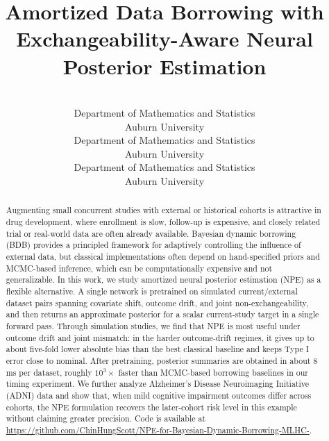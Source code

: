 \documentclass[pmlr]{jmlr}
\title{%
 Amortized Data Borrowing with Exchangeability-Aware Neural Posterior Estimation}
\author{%
  \Name{Chin-Hung Huang}
  \Email{czh0162@auburn.edu}\\
  \addr Department of Mathematics and Statistics\\
  Auburn University
  \AND
  \Name{JooChul Lee}
  \Email{jzl0375@auburn.edu}\\
  \addr Department of Mathematics and Statistics\\
  Auburn University
  \AND
  \Name{Huan He}
  \Email{huan.he@auburn.edu}\\
  \addr Department of Mathematics and Statistics\\
  Auburn University
}
\begin{document}
\maketitle

\begin{abstract}
Augmenting small concurrent studies with external or historical cohorts
is attractive in drug development, where enrollment is slow, follow-up is
expensive, and closely related trial or real-world data are often
already available.
Bayesian dynamic borrowing (BDB) provides a principled framework for adaptively controlling the influence of external data, but classical implementations often depend on hand-specified priors and MCMC-based inference, which can be computationally expensive and not generalizable.
In this work, we study amortized neural posterior estimation (NPE) as a flexible alternative.
A single network is pretrained on simulated current/external dataset
pairs spanning covariate shift, outcome drift, and joint
non-exchangeability, and then returns an approximate posterior for a
scalar current-study target in a single forward pass.
Through simulation studies, we find that NPE is most useful under outcome drift and joint mismatch: in the harder outcome-drift regimes, it gives up to about five-fold lower absolute bias than the best classical baseline and keeps Type I error close to nominal. After pretraining, posterior summaries are obtained in about 8 ms per dataset, roughly $10^3\times$ faster than MCMC-based borrowing baselines in our timing experiment. We further analyze Alzheimer's Disease Neuroimaging Initiative (ADNI) data and show that, when mild cognitive impairment outcomes differ across cohorts, the NPE formulation recovers the later-cohort risk level in this example without claiming greater precision. Code is available at \url{https://github.com/ChinHungScott/NPE-for-Bayesian-Dynamic-Borrowing-MLHC-}.
\end{abstract}







\newpage

\newpage
\appendix

\end{document}

